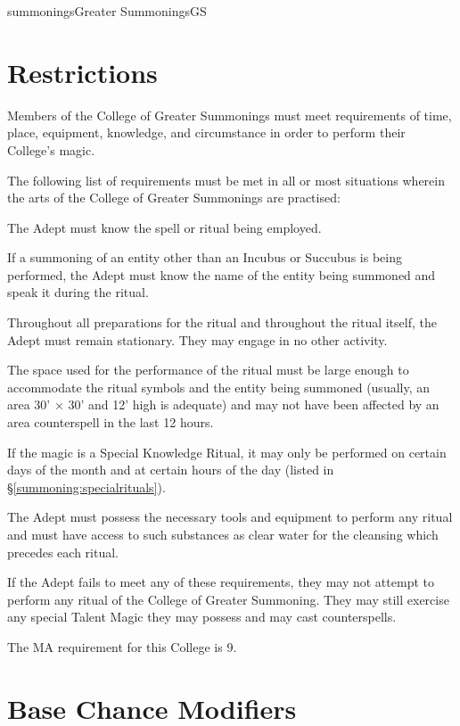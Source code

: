 \begin{College}[1.0]{summonings}{Greater Summonings}{GS}
\section{Restrictions}

Members of the College of Greater Summonings must meet requirements of
time, place, equipment, knowledge, and circumstance in order to
perform their College’s magic.

The following list of requirements must be met in all or most
situations wherein the arts of the College of Greater Summonings are
practised:
\begin{Enumerate}
\item  The Adept must know the spell or ritual being employed.

\item If a summoning of an entity other than an Incubus or Succubus is
being performed, the Adept must know the name of the entity being
summoned and speak it during the ritual.

\item  Throughout all preparations for the ritual and throughout the
ritual itself, the Adept must remain stationary. They may engage in no
other activity.

\item The space used for the performance of the ritual must be large
enough to accommodate the ritual symbols and the entity being summoned
(usually, an area 30’ × 30’ and 12’ high is adequate) and may not have
been affected by an area counterspell in the last 12 hours.

\item If the magic is a Special Knowledge Ritual, it may only be
  performed on certain days of the month and at certain hours of the
  day (listed in \S\ref{summoning:specialrituals}).


\item The Adept must possess the necessary tools and equipment to
  perform any ritual and must have access to such substances as clear
  water for the cleansing which precedes each ritual.
\end{Enumerate}

If the Adept fails to meet any of these requirements, they may not
attempt to perform any ritual of the College of Greater Summoning.
They may still exercise any special Talent Magic they may possess and
may cast counterspells.

The MA requirement for this College is 9. 

\section{Base Chance Modifiers}


\end{College}
